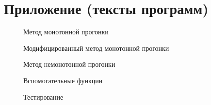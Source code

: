 \section{Приложение (тексты программ)}

\begin{figure}[H]
  
  \caption*{Метод монотонной прогонки}
\end{figure}

\pagebreak

\begin{figure}[H]
  
  \caption*{Модифицированный метод монотонной прогонки}
\end{figure}

\pagebreak

\begin{figure}[H]
  
  \caption*{Метод немонотонной прогонки}
\end{figure}

\pagebreak

\begin{figure}[H]
  
  \caption*{Вспомогательные функции}
\end{figure}

\pagebreak

\begin{figure}[H]
  
  \caption*{Тестирование}
\end{figure}
